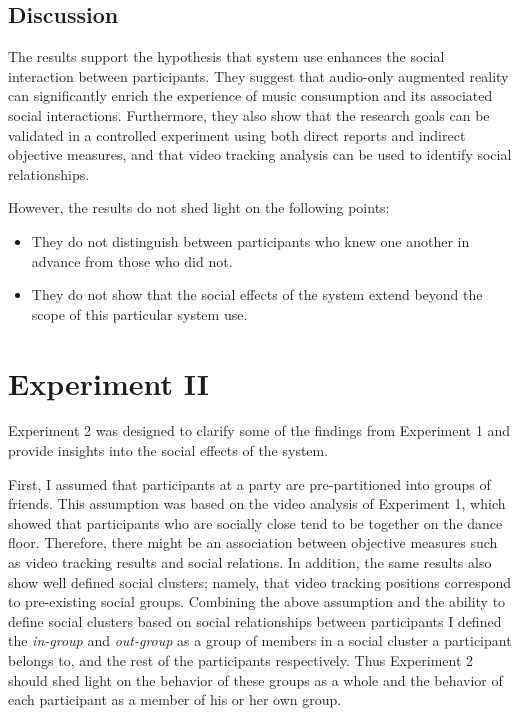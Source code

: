 \documentclass[a4paper,11pt]{article}
\newcommand{\definition}[1]{\emph{#1}}
\begin{document}
{\subsection{Discussion}

The results support the hypothesis that system use enhances the social interaction between participants.
They suggest that audio-only augmented reality can significantly enrich the experience of music consumption and its associated social interactions.
Furthermore, they also show that the research goals can be validated in a controlled experiment using both direct reports and indirect objective measures, and that video tracking analysis can be used to identify social relationships.

However, the results do not shed light on the following points:

\begin{itemize}
	\item They do not distinguish between participants who knew one another in advance from those who did not.
	\item They do not show that the social effects of the system extend beyond the scope of this particular system use.
\end{itemize}

\section{Experiment II}

Experiment 2 was designed to clarify some of the findings from Experiment 1 and provide insights into the social effects of the system.

First, I assumed that participants at a party are pre-partitioned into groups of friends.
This assumption was based on the video analysis of Experiment 1, which showed that participants who are socially close tend to be together on the dance floor.
Therefore, there might be an association between objective measures such as video tracking results and social relations.
In addition, the same results also show well defined social clusters;
namely, that video tracking positions correspond to pre-existing social groups.
Combining the above assumption and the ability to define social clusters based on social relationships between participants I defined the \definition{in-group} and \definition{out-group} as a group of members in a social cluster a participant belongs to, and the rest of the participants respectively.
Thus Experiment 2 should shed light on the behavior of these groups as a whole and the behavior of each participant as a member of his or her own group.

}
\end{document}

